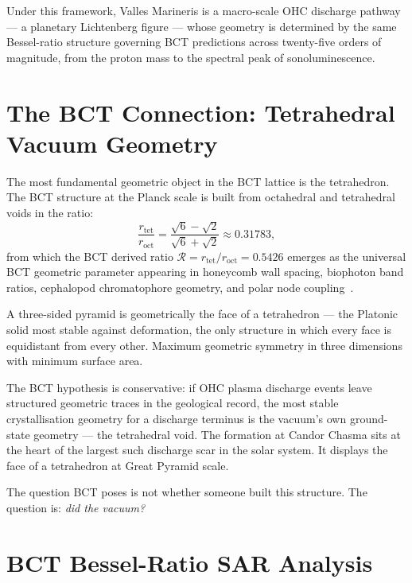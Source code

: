\documentclass[12pt,twocolumn]{article}
\begin{document}
Under this framework, Valles Marineris is a macro-scale OHC
discharge pathway --- a planetary Lichtenberg figure --- whose
geometry is determined by the same Bessel-ratio structure
governing BCT predictions across twenty-five orders of magnitude,
from the proton mass to the spectral peak of sonoluminescence.

\section{The BCT Connection: Tetrahedral Vacuum Geometry}

The most fundamental geometric object in the BCT lattice is the
tetrahedron. The BCT structure at the Planck scale is built from
octahedral and tetrahedral voids in the ratio:
\begin{equation}
  \frac{r_{\mathrm{tet}}}{r_{\mathrm{oct}}}
  = \frac{\sqrt{6}-\sqrt{2}}{\sqrt{6}+\sqrt{2}}
  \approx 0.31783,
\end{equation}
from which the BCT derived ratio
$\mathcal{R} = r_{\mathrm{tet}}/r_{\mathrm{oct}} = 0.5426$
emerges as the universal BCT geometric parameter appearing in
honeycomb wall spacing, biophoton band ratios, cephalopod
chromatophore geometry, and polar node coupling~\cite{BCT_Letters}.

A three-sided pyramid is geometrically the face of a tetrahedron
--- the Platonic solid most stable against deformation, the only
structure in which every face is equidistant from every other.
Maximum geometric symmetry in three dimensions with minimum
surface area.

The BCT hypothesis is conservative: if OHC plasma discharge events
leave structured geometric traces in the geological record, the
most stable crystallisation geometry for a discharge terminus is
the vacuum's own ground-state geometry --- the tetrahedral void.
The formation at Candor Chasma sits at the heart of the largest
such discharge scar in the solar system. It displays the face of
a tetrahedron at Great Pyramid scale.

The question BCT poses is not whether someone built this structure.
The question is: \textit{did the vacuum?}

\section{BCT Bessel-Ratio SAR Analysis}
\end{document}
